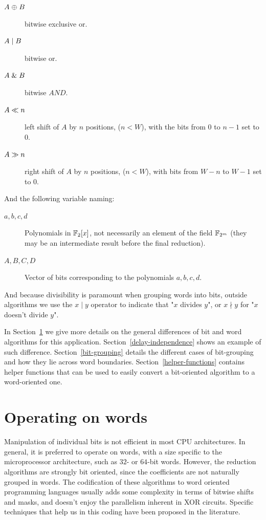 \begin{description}
\item[$A \mathrel{\oplus} B$] bitwise exclusive or.
\item[$A \mathrel{|} B$]  bitwise or. 
\item[$A \mathrel{\&} B$]      bitwise $AND$.
\item[$A \ll n$]      left shift of $A$ by $n$ positions, ($n<W$), with the bits from 0 to $n-1$ set to $0$. 
\item[$A\gg n$]     right shift of $A$ by $n$ positions, ($n<W$), with bits from $W-n$ to $W-1$ set to $0$. 
\end{description}

And the following variable naming:

\begin{description}
\item[$a, b, c, d$]  Polynomials in $\mathbb{F}_2[x]$, not necessarily an element of the field $\mathbb{F}_{2^m}$ (they may be an intermediate result before the final reduction).
\item[$A, B, C, D$]  Vector of bits corresponding to the polynomials $a, b, c, d$.
\end{description}

And because divisibility is paramount when grouping words into bits, outside algorithms we use the $x \mid y$ operator to indicate that "$x$ divides $y$", or $x \nmid y$ for "$x$ doesn't divide $y$".

In Section~\ref{operating-on-words} we give more details on the general differences of bit and word algorithms for this application. Section~\ref{delay-independence} shows an example of such difference. Section~\ref{bit-grouping} details the different cases of bit-grouping and how they lie across word boundaries. Section~\ref{helper-functions} contains helper functions that can be used to easily convert a bit-oriented algorithm to a word-oriented one.

\section{Operating on words}\label{operating-on-words}

Manipulation of individual bits is not efficient in most CPU architectures. In general, it is preferred to operate on words, with a size specific to the microprocessor architecture, such as $32$- or $64$-bit words. However, the reduction algorithms are strongly bit oriented, since the coefficients are not naturally grouped in words. The codification of these algorithms to word oriented programming languages usually adds some complexity in terms of bitwise shifts and masks, and doesn't enjoy the parallelism inherent in XOR circuits. Specific techniques that help us in this coding have been proposed in the literature\cite{Hilewitz2008}.  \\


